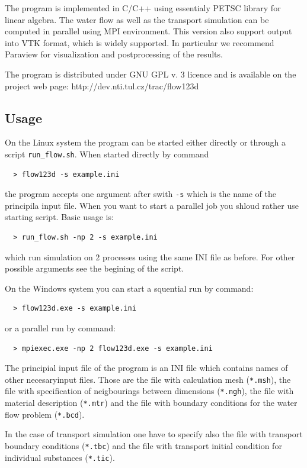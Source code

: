 The program is implemented in C/C++ using essentialy PETSC library for linear algebra. The water flow as well as the transport simulation can be computed 
in parallel using MPI environment. This version also support output into VTK format, which is widely supported. In particular we recommend Paraview for 
visualization and postprocessing of the results.

The program is distributed under GNU GPL v. 3 licence and is available on the project web page:
http://dev.nti.tul.cz/trac/flow123d

\subsection*{Usage}
On the Linux system the program can be started either directly or through a script \verb'run_flow.sh'. When started directly by command
\begin{verbatim}
  > flow123d -s example.ini
\end{verbatim}
the program accepts one argument after swith \verb'-s' which is the name of the principila input file. When you want to start a parallel job
you shloud rather use starting script. Basic usage is:
\begin{verbatim}
  > run_flow.sh -np 2 -s example.ini
\end{verbatim}
which run simulation on 2 processes using the same INI file as before. For other possible arguments see the begining of the script.

On the Windows system you can start a squential run by command:
\begin{verbatim}
  > flow123d.exe -s example.ini
\end{verbatim}
or a parallel run by command:
\begin{verbatim}
  > mpiexec.exe -np 2 flow123d.exe -s example.ini
\end{verbatim}



The principial input file of the program is an INI file which contains names of other necesaryinput files.
Those are the file with calculation mesh (\verb'*.msh'), the file with specification of neigbourings between dimensions (\verb'*.ngh'),
the file with material description (\verb'*.mtr') and the file with boundary conditions for the water flow problem (\verb'*.bcd').

In the case of transport simulation one have to specify also the file with transport boundary conditions (\verb'*.tbc') 
and the file with transport initial condition
for individual substances (\verb'*.tic').

